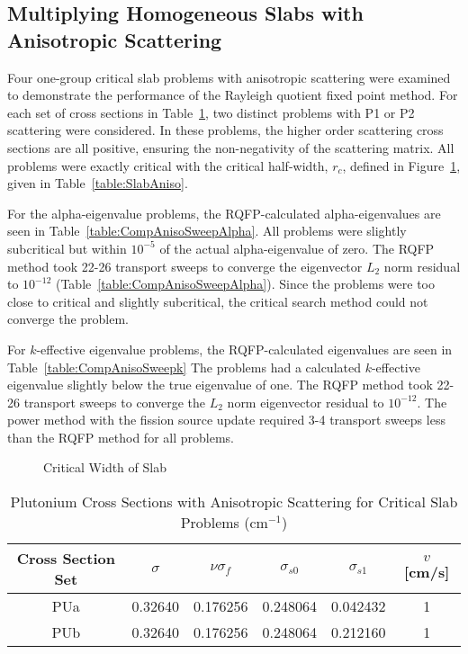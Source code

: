 \subsection{Multiplying Homogeneous Slabs with Anisotropic Scattering}

Four one-group critical slab problems with anisotropic scattering were examined to demonstrate the performance of the Rayleigh quotient fixed point method. For each set of cross sections in Table~\ref{table:SoodPUAniso}, two distinct problems with P1 or P2 scattering were considered. In these problems, the higher order scattering cross sections are all positive, ensuring the non-negativity of the scattering matrix. All problems were exactly critical with the critical half-width, $r_{c}$, defined in Figure~\ref{fig:SlabCritWidth}, given in Table~\ref{table:SlabAniso}.

For the alpha-eigenvalue problems, the RQFP-calculated alpha-eigenvalues are seen in Table~\ref{table:CompAnisoSweepAlpha}. All problems were slightly subcritical but within $10^{-5}$ of the actual alpha-eigenvalue of zero. The RQFP method took 22-26 transport sweeps to converge the eigenvector $L_{2}$ norm residual to $10^{-12}$ (Table~\ref{table:CompAnisoSweepAlpha}). Since the problems were too close to critical and slightly subcritical, the critical search method could not converge the problem.

For $k$-effective eigenvalue problems, the RQFP-calculated eigenvalues are seen in Table~\ref{table:CompAnisoSweepk} The problems had a calculated $k$-effective eigenvalue slightly below the true eigenvalue of one. The RQFP method took 22-26 transport sweeps to converge the $L_{2}$ norm eigenvector residual to $10^{-12}$. The power method with the fission source update required 3-4 transport sweeps less than the RQFP method for all problems.

\begin{figure}[!htbp]
	\centering
	
	\caption{Critical Width of Slab}
	\label{fig:SlabCritWidth}
\end{figure}

\begin{table}[!htbp]
	\caption{Plutonium Cross Sections with Anisotropic Scattering for Critical Slab Problems (cm$^{-1}$) \cite{sood2003analytical}}
	\label{table:SoodPUAniso}
	\centering{}
    \begin{tabular}{*6c}
        \toprule
	Cross Section Set & $\sigma$ & $\nu \sigma_{f}$ & $\sigma_{s0}$  & $\sigma_{s1}$ & $v$ [cm/s] \\ 
        \midrule
	PUa & 0.32640 & 0.176256 & 0.248064 & 0.042432 & 1 \\
	PUb & 0.32640 & 0.176256 & 0.248064 & 0.212160 & 1 \\
        \bottomrule
    \end{tabular}
\end{table}

